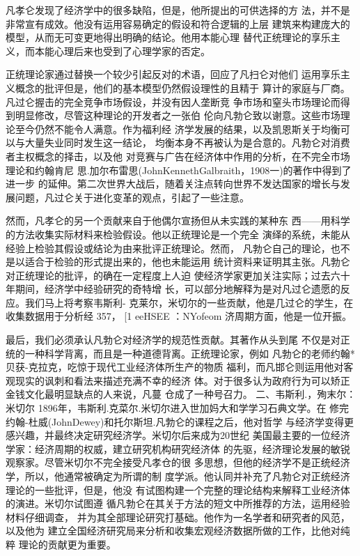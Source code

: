 凡孝仑发现了经济学中的很多缺陷，但是，他所提出的可供选择的方
法，并不是非常宣有成效。他没有运用容易确定的假设和符合逻辑的上层
建筑来构建庞大的模型，从而无可变更地得出明确的结论。他用本能心理
替代正统理论的享乐主义，而本能心理后来也受到了心理学家的否定。

正统理论家通过替换一个较少引起反对的术语，回应了凡扫仑对他们
运用享乐主义概念的批评但是，他们的基本模型仍然假设理性的且精于
算计的家庭与厂商。凡过仑握击的完全竞争市场假设，并没有因人垄断竞
争市场和窒头市场理论而得到明显修改，尽管这种理论的开发者之一张伯
伦向凡勃仑致以谢意。这些市场理论至今仍然不能令人满意。作为福利经
济学发展的结果，以及凯恩斯关于均衡可以与大量失业同时发生这一结论，
均衡本身不再被认为是合意的。凡勃仑对消费者主权概念的择击，以及他
对竞赛与广告在经济体中作用的分析，在不完全市场理论和约翰肯尼
思.加尔布雷思(JohnKennethGalbraith，1908一)的著作中得到了进一步
的延伸。第二次世界大战后，随着关注点转向世界不发达国家的增长与发
展问题，凡过仑关于进化变革的观点，引起了一些注意。

然而，凡孝仑的另一个贡献来自于他偶尔宣扬但从未实践的某种东
西——用科学的方法收集实际材料来检验假设。他以正统理论是一个完全
演绎的系统，未能从经验上检验其假设或结论为由来批评正统理论。然而，
凡勃仑自己的理论，也不是以适合于检验的形式提出来的，他也未能运用
统计资料来证明其主张。凡勃仑对正统理论的批评，的确在一定程度上人迫
使经济学家更加关注实际；过去六十年期间，经济学中经验研究的奇特增
长，可以部分地解释为是对凡过仑遗愿的反应。我们马上将考察韦斯利-
克莱尔，米切尔的一些贡献，他是几过仑的学生，在收集数据用于分析经
357，
[1
eeHSEE
：NYofeom
济周期方面，他是一位开振。

最后，我们必须承认凡勃仑对经济学的规范性贡献。其著作从头到尾
不仅是对正统的一种科学背离，而且是一种道德背离。正统理论家，例如
凡勃仑的老师约翰*贝获-克拉克，吃惊于现代工业经济体所生产的物质
福利，而凡邯仑则运用他对客观现实的讽刺和看法来描述充满不幸的经济
体。对于很多认为政府行为可以矫正金钱文化最明显缺点的人来说，凡蔓
仓成了一种号召力。
二、韦斯利.，殉末尔：米切尔
1896年，韦斯利.克菜尔.米切尔进入世加妈大和学学习石典文学。在
修完约翰-杜威(JohnDewey)和托尔斯坦.凡勃仑的课程之后，他对哲学
与经济学变得更感兴趣，并最终决定研究经济学。米切尔后来成为20世纪
美国最主要的一位经济学家：经济周期的权威，建立研究机构研究经济体
的先驱，经济理论发展的敏锐观察家。尽管米切尔不完全接受凡孝仓的很
多思想，但他的经济学不是正统经济学，所以，他通常被确定为所谓的制
度学派。他认同并补充了凡勃仑对正统经济理论的一些批评，但是，他没
有试图构建一个完整的理论结构来解释工业经济体的演进。米切尔试图遵
循凡勃仑在其关于方法的短文中所推荐的方法，运用经验材料仔细调查，
并为其全部理论研究打基础。他作为一名学者和研究者的风范，以及他为
建立全国经济研究局来分析和收集宏观经济数据所做的工作，比他对纯粹
理论的贡献更为重要。

